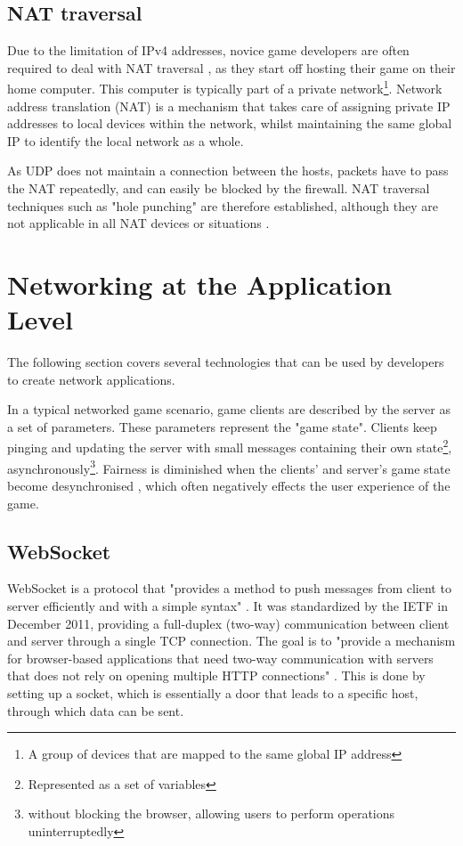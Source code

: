 \documentclass[bsc, 12pt, twoside, singlespacing, parskip, abbrevs, notimes, normalheadings, logo]{styles/infthesis}
\begin{document}
\subsection{NAT traversal}
Due to the limitation of IPv4 addresses, novice game developers are often required to deal with NAT traversal \cite{NAT}, as they start off hosting their game on their home computer. This computer is typically part of a private network\footnote{A group of devices that are mapped to the same global IP address}. Network address translation (NAT) is a mechanism that takes care of assigning private IP addresses to local devices within the network, whilst maintaining the same global IP to identify the local network as a whole.

As UDP does not maintain a connection between the hosts, packets have to pass the NAT repeatedly, and can easily be blocked by the firewall. 
NAT traversal techniques such as "hole punching" are therefore established, although they are not applicable in all NAT devices or situations \cite{udp_holepunching}.

\section{Networking at the Application Level}
The following section covers several technologies that can be used by developers to create network applications.

In a typical networked game scenario, game clients are described by the server as a set of parameters. These parameters represent the "game state". Clients keep pinging and updating the server with small messages containing their own state\footnote{Represented as a set of variables}, asynchronously\footnote{without blocking the browser, allowing users to perform operations uninterruptedly}. Fairness is diminished when the clients' and server's game state become desynchronised \cite{Fairness_and_Playability}, which often negatively effects the user experience of the game.

\subsection{WebSocket}
WebSocket is a protocol that "provides a method to push messages from client to server efficiently and with a simple syntax" \cite{WebSocket}. It was standardized by the IETF in December 2011, providing a full-duplex (two-way) communication between client and server through a single TCP connection. The goal is to "provide a mechanism for browser-based applications that need two-way communication with servers that does not rely on opening multiple HTTP connections" \cite{websocket_communication}. This is done by setting up a socket, which is essentially a door that leads to a specific host, through which data can be sent.
\end{document}
